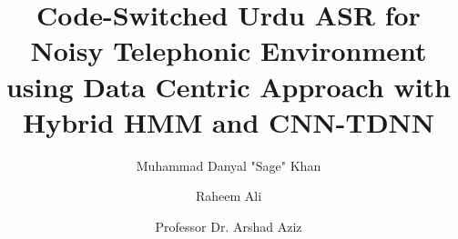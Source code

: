 \documentclass[3p,times]{elsarticle}
\begin{document}
\begin{frontmatter}




\title{Code-Switched Urdu ASR for Noisy Telephonic Environment using Data Centric Approach with Hybrid HMM and CNN-TDNN}


\author[A1]{Muhammad Danyal "Sage" Khan}
\author[A2]{Raheem Ali}
\author[A1]{Professor Dr. Arshad Aziz}

\address[A1]{Department of Cyber Security, Pakistan Naval Engineering College, National University of Science and Technology, Karachi, Pakistan}
\address[A2]{Department of Computer Sciences, Bahria University, Karachi, Pakistan}


\end{frontmatter}
\end{document}
